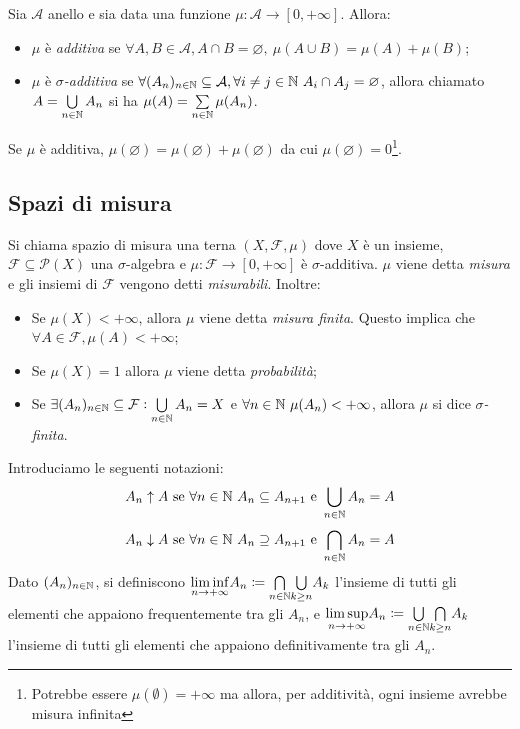 \begin{definition}
	Sia $\mathcal{A}$ anello e sia data una funzione $\mu:\mathcal{A} \rightarrow[0,+\infty]$. Allora:
	\begin{itemize}
		\item $\mu$ è \emph{additiva} se $\forall A,B \in \mathcal{A}, A\cap B=\varnothing,\ \mu( A\cup B)=\mu(A)+\mu(B)$;
		\item $\mu$ è \emph{$\sigma$-additiva} se $\forall (A_n)_{n\in\mathbb{N}}\subseteq \mathcal{A}, \forall i\neq j \in \mathbb{N} \ A_i\cap A_j =\varnothing$, allora chiamato $ A=\bigcup\limits_{n\in\mathbb{N}}A_n$ si ha $\mu(A)=\sum\limits_{n\in\mathbb{N}} \mu(A_n)$.
	\end{itemize}
\end{definition}

\begin{oss}
	Se $\mu$ è additiva, $\mu(\varnothing)=\mu(\varnothing)+\mu(\varnothing)$ da cui $\mu(\varnothing)=0$\footnote{Potrebbe essere $ \mu(\emptyset) = +\infty $ ma allora, per additività, ogni insieme avrebbe misura infinita}.
\end{oss}

\subsection{Spazi di misura}
\begin{definition}
	Si chiama spazio di misura una terna $(X,\mathcal{F}, \mu)$ dove $X$ è un insieme, ${\mathcal{F}\subseteq \mathscr{P}(X)}$ una $\sigma$-algebra e $\mu\colon\mathcal{F} \to [0,+\infty]$ è $\sigma$-additiva. $\mu$ viene detta \emph{misura} e gli insiemi di $\mathcal{F}$ vengono detti \emph{misurabili}.
	Inoltre:
	\begin{itemize}
		\item Se $\mu(X)<+\infty$, allora $\mu$ viene detta \emph{misura finita}. Questo implica che $\forall A \in \mathcal{F}, {\mu(A) < +\infty} $;
		\item Se $\mu(X)=1$ allora $\mu$ viene detta \emph{probabilità};
		\item Se $\exists (A_n)_{n\in\mathbb{N}}\subseteq\mathcal{F} : \bigcup\limits_{n\in\mathbb{N}}A_n=X$ e $\forall n \in\mathbb{N} \ \mu(A_n) <+\infty$, allora $\mu$ si dice \emph{$\sigma$-finita}.
	\end{itemize}
\end{definition}
Introduciamo le seguenti notazioni:
\[ A_n \uparrow   A \text{ se } \forall n \in\mathbb{N} \ A_n \subseteq A_{n+1} \text{ e } \bigcup\limits_{n\in \mathbb{N}}A_n = A \]
\[ A_n \downarrow A \text{ se } \forall n \in\N \ A_n \supseteq A_{n+1} \text{ e } \bigcap\limits_{n\in \N}A_n = A \]
Dato $(A_n)_{n\in\mathbb{N}}$, si definiscono $\underset{n\to+\infty}{\liminf}A_n \coloneqq\underset{n\in\mathbb{N}}{\bigcap}\underset{k\geq n}{\bigcup}A_k$ l'insieme di tutti gli elementi che appaiono frequentemente tra gli $A_n$, e $\underset{n\to +\infty}{\limsup}A_n\coloneqq\underset{n\in\mathbb{N}}{\bigcup}\underset{k\geq n}{\bigcap}A_k$ l'insieme di tutti gli elementi che appaiono definitivamente tra gli $A_n$.

